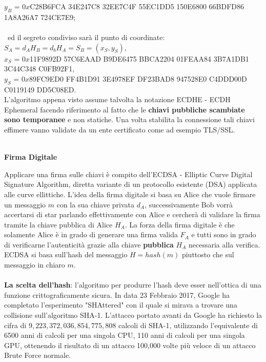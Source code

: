 \documentclass[a4paper,12pt]{tesiinfo}
\begin{document}
$y_B$ = $0x$C28B6FCA 34E247C8 32EE7C4F 55EC1DD5 150E6800 66BDFD86 1A8A26A7 724CE7E9;\\
\\\
ed il segreto condiviso sar\`a il punto di coordinate:\\
$S_A = d_AH_B = d_bH_A = S_B = (x_S, y_S)$,\\
$x_S$ = $0x$11F9892D 57C6EAAD B9DE6475 BBCA2204 01FEAA84 3B7A1DB1 3C44C348 C0FB92F1,\\
$y_S$ = $0x$89FC9ED0 FF4B1D91 3E4978EF DF23BAD8 947528E0 C4DDD00D C0119149 DD5C08ED.
\\
L'algoritmo appena visto assume talvolta la notazione ECDHE - ECDH Ephemeral facendo riferimento al fatto che le \textbf{chiavi pubbliche scambiate sono temporanee} e non statiche. Una volta stabilita la connessione tali chiavi effimere vanno validate da un ente certificato come ad esempio TLS/SSL.
\\
\\
\begin{center}
    \textbf{Firma Digitale}
\end{center}
Applicare una firma sulle chiavi \`e compito dell'ECDSA - Elliptic Curve Digital Signature Algorithm, diretta variante di un protocollo esistente (DSA) applicata alle curve ellittiche. L'idea della firma digitale si basa su Alice che vuole firmare un messaggio $m$ con la sua chiave privata $d_A$, successivamente Bob vorr\`a accertarsi di star parlando effettivamente con Alice e cercher\`a di validare la firma tramite la chiave pubblica di Alice $H_A$. La forza della firma digitale \`e che solamente Alice \`e in grado di generare una firma valida $F_A$ e tutti sono in grado di verificarne l'autenticit\`a grazie alla chiave \textbf{pubblica} $H_A$ necessaria alla verifica.
\\
ECDSA si basa sull'hash del messaggio $H = hash(m)$ piuttosto che sul messaggio in chiaro $m$.
\\
\\
\textbf{La scelta dell'hash}: l'algoritmo per produrre l'hash deve esser nell'ottica di una funzione crittograficamente sicura. In data 23 Febbraio 2017, Google ha completato l'esperimento "SHAttered" con il quale si mirava a trovare una collisione sull'algoritmo SHA-1. L'attacco portato avanti da Google ha richiesto la cifra di $9,223,372,036,854,775,808$ calcoli di SHA-1, utilizzando l'equivalente di 6500 anni di calcoli per una singola CPU, 110 anni di calcoli per una singola GPU, ottenendo il risultato di un attacco 100,000 volte pi\`u veloce di un attacco Brute Force normale.
\end{document}
